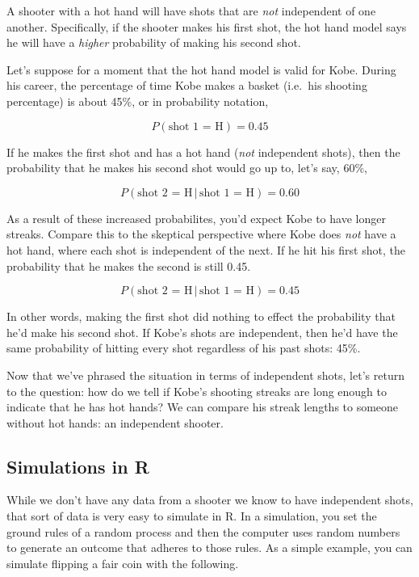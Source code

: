 \documentclass[
]{article}
\begin{document}
A shooter with a hot hand will have shots that are \emph{not}
independent of one another. Specifically, if the shooter makes his first
shot, the hot hand model says he will have a \emph{higher} probability
of making his second shot.

Let's suppose for a moment that the hot hand model is valid for Kobe.
During his career, the percentage of time Kobe makes a basket (i.e.~his
shooting percentage) is about 45\%, or in probability notation,

\[ P(\textrm{shot 1 = H}) = 0.45 \]

If he makes the first shot and has a hot hand (\emph{not} independent
shots), then the probability that he makes his second shot would go up
to, let's say, 60\%,

\[ P(\textrm{shot 2 = H} \, | \, \textrm{shot 1 = H}) = 0.60 \]

As a result of these increased probabilites, you'd expect Kobe to have
longer streaks. Compare this to the skeptical perspective where Kobe
does \emph{not} have a hot hand, where each shot is independent of the
next. If he hit his first shot, the probability that he makes the second
is still 0.45.

\[ P(\textrm{shot 2 = H} \, | \, \textrm{shot 1 = H}) = 0.45 \]

In other words, making the first shot did nothing to effect the
probability that he'd make his second shot. If Kobe's shots are
independent, then he'd have the same probability of hitting every shot
regardless of his past shots: 45\%.

Now that we've phrased the situation in terms of independent shots,
let's return to the question: how do we tell if Kobe's shooting streaks
are long enough to indicate that he has hot hands? We can compare his
streak lengths to someone without hot hands: an independent shooter.

\hypertarget{simulations-in-r}{%
\subsection{Simulations in R}\label{simulations-in-r}}

While we don't have any data from a shooter we know to have independent
shots, that sort of data is very easy to simulate in R. In a simulation,
you set the ground rules of a random process and then the computer uses
random numbers to generate an outcome that adheres to those rules. As a
simple example, you can simulate flipping a fair coin with the
following.
\end{document}
